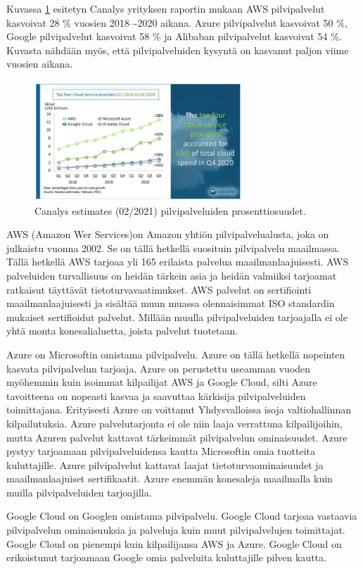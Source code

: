 Kuvassa \ref{canalys} esitetyn Canalys yrityksen raportin mukaan AWS pilvipalvelut kasvoivat 28 \% vuosien 2018–-2020 aikana. Azure pilvipalvelut kasvoivat 50 \%, Google pilvipalvelut kasvoivat 58 \% ja Alibaban pilvipalvelut kasvoivat 54 \%. Kuvasta nähdään myös, että pilvipalveluiden kysyntä on kasvanut paljon viime vuosien aikana.

\begin{figure}[ht]
\centering 
\includegraphics[width=0.70\textwidth]{figures/Canalys.png}
\caption{Canalys estimates (02/2021) pilvipalveluiden prosenttiosuudet. \citep{top_cloud}}\label{canalys}
\end{figure}

AWS (Amazon Wer Services)on Amazon yhtiön pilvipalvelualusta, joka on julkaistu vuonna 2002. Se on tällä hetkellä suosituin pilvipalvelu maailmassa. Tällä hetkellä AWS tarjoaa yli 165 erilaista palvelua maailmanlaajuisesti. AWS palveluiden turvallisuus on heidän tärkein asia ja heidän valmiiksi tarjoamat ratkaisut täyttävät tietoturvavaatimukset. AWS palvelut on sertifiointi maailmanlaajuisesti ja sisältää muun muassa olennaisimmat ISO standardin mukaiset sertifioidut palvelut. Millään muulla pilvipalveluiden tarjoajalla ei ole yhtä monta konesalialuetta, joista palvelut tuotetaan.\citep{top_cloud}

Azure on Microsoftin omistama pilvipalvelu. Azure on tällä hetkellä nopeinten kasvata pilvipalvelun tarjoaja. Azure on perustettu useamman vuoden myöhemmin kuin isoimmat kilpailijat AWS ja Google Cloud, silti Azure tavoitteena on nopeasti kasvaa ja saavuttaa kärkisija pilvipalveluiden toimittajana. Erityisesti Azure on voittanut Yhdysvalloissa isoja valtiohallinnan kilpailutuksia. Azure palvelutarjonta ei ole niin laaja verrattuna kilpailijoihin, mutta Azuren palvelut kattavat tärkeimmät pilvipalvelun ominaisuudet. Azure pystyy tarjoamaan pilvipalveluidensa kautta Microsoftin omia tuotteita kuluttajille. Azure pilvipalvelut kattavat laajat tietoturvaominaisuudet ja maailmanlaajuiset sertifikaatit. Azure enemmän konesaleja maailmalla kuin muilla pilvipalveluiden tarjoajilla.\citep{top_cloud}

Google Cloud on Googlen omistama pilvipalvelu. Google Cloud tarjoaa vastaavia pilvipalvelun ominaisuuksia ja palveluja kuin muut pilvipalvelujen toimittajat. Google Cloud on pienempi kuin kilpailijansa AWS ja Azure. Google Cloud on erikoistunut tarjoamaan Google omia palveluita kuluttajille pilven kautta.\citep{top_cloud}
